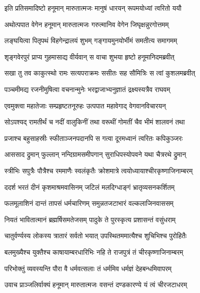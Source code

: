 \twolineshloka
{इति प्रतिसमादिष्टो हनूमान् मारुतात्मजः}
{मानुषं धारयन् रूपमयोध्यां त्वरितो ययौ} %

\twolineshloka
{अथोत्पपात वेगेन हनूमान् मारुतात्मजः}
{गरुत्मानिव वेगेन जिघृक्षन्नुरगोत्तमम्} %

\twolineshloka
{लङ्घयित्वा पितृपथं विहगेन्द्रालयं शुभम्}
{गङ्गायमुनयोर्भीमं समतीत्य समागमम्} %

\twolineshloka
{शृङ्गवेरपुरं प्राप्य गुहमासाद्य वीर्यवान्}
{स वाचा शुभया हृष्टो हनूमानिदमब्रवीत्} %

\twolineshloka
{सखा तु तव काकुत्स्थो रामः सत्यपराक्रमः}
{ससीतः सह सौमित्रिः स त्वां कुशलमब्रवीत्} %

\twolineshloka
{पञ्चमीमद्य रजनीमुषित्वा वचनान्मुनेः}
{भरद्वाजाभ्यनुज्ञातं द्रक्ष्यस्यत्रैव राघवम्} %

\twolineshloka
{एवमुक्त्वा महातेजाः सम्प्रहृष्टतनूरुहः}
{उत्पपात महावेगाद् वेगवानविचारयन्} %

\twolineshloka
{सोऽपश्यद् रामतीर्थं च नदीं वालुकिनीं तथा}
{वरूथीं गोमतीं चैव भीमं शालवनं तथा} %

\twolineshloka
{प्रजाश्च बहुसाहस्रीः स्फीताञ्जनपदानपि}
{स गत्वा दूरमध्वानं त्वरितः कपिकुञ्जरः} %

\twolineshloka
{आससाद द्रुमान् फुल्लान् नन्दिग्रामसमीपगान्}
{सुराधिपस्योपवने यथा चैत्ररथे द्रुमान्} %

\twolineshloka
{स्त्रीभिः सपुत्रैः पौत्रैश्च रममाणैः स्वलंकृतैः}
{क्रोशमात्रे त्वयोध्यायाश्चीरकृष्णाजिनाम्बरम्} %

\twolineshloka
{ददर्श भरतं दीनं कृशमाश्रमवासिनम्}
{जटिलं मलदिग्धाङ्गं भ्रातृव्यसनकर्शितम्} %

\twolineshloka
{फलमूलाशिनं दान्तं तापसं धर्मचारिणम्}
{समुन्नतजटाभारं वल्कलाजिनवाससम्} %

\twolineshloka
{नियतं भावितात्मानं ब्रह्मर्षिसमतेजसम्}
{पादुके ते पुरस्कृत्य प्रशासन्तं वसुंधराम्} %

\twolineshloka
{चातुर्वर्ण्यस्य लोकस्य त्रातारं सर्वतो भयात्}
{उपस्थितममात्यैश्च शुचिभिश्च पुरोहितैः} %

\twolineshloka
{बलमुख्यैश्च युक्तैश्च काषायाम्बरधारिभिः}
{नहि ते राजपुत्रं तं चीरकृष्णाजिनाम्बरम्} %

\twolineshloka
{परिभोक्तुं व्यवस्यन्ति पौरा वै धर्मवत्सलाः}
{तं धर्ममिव धर्मज्ञं देहबन्धमिवापरम्} %

\twolineshloka
{उवाच प्राञ्जलिर्वाक्यं हनूमान् मारुतात्मजः}
{वसन्तं दण्डकारण्ये यं त्वं चीरजटाधरम्} %

